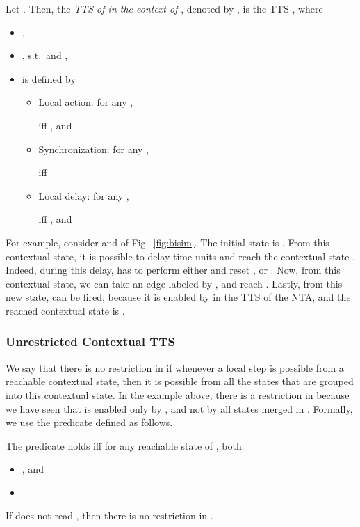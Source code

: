 \documentclass{LMCS}
\theoremstyle{plain}\newtheorem*{prop11}{Proposition~\ref{prop:states} bis}
\begin{document}
\begin{defi}
Let \mbox{}.
Then, the \emph{TTS of  in the context of }, denoted by
, is the TTS
, where
\begin{itemize}
  \item , \item , s.t.\  and
  ,
  \item  is defined by
  \begin{itemize}
    \item Local action: for any ,
    
    iff ,
    and 
\item Synchronization: for any ,
    
    iff 
\item Local delay: for any ,
    
    iff , and  
\end{itemize}
\end{itemize}
\end{defi}

\noindent For example, consider  and  of Fig.~\ref{fig:bisim}. The initial
state is . From this contextual
state, it is possible to delay  time units and reach the contextual
state . Indeed,
during this delay,  has to perform either  and reset , or
. Now, from this contextual state, we can take an edge labeled by ,
and reach . Lastly,
from this new state,  can be fired, because it is enabled by
 in the TTS of the NTA, and the reached
contextual state is .




\subsubsection*{Unrestricted Contextual TTS}
We say that there is no restriction in  if whenever a local
step is possible from a reachable contextual state, then it is possible from all
the states  that are grouped into this contextual state.
In the example above, there is a restriction in  because
we have seen that  is enabled only by ,
and not by all states merged in
.
Formally, we use the predicate  defined as follows.

\begin{defi}[\text{}]
The predicate  holds iff for any reachable state
 of , both
\begin{itemize}
  \item , and
  \item 
\end{itemize}
\end{defi}
\begin{rem}\label{rem:noread_norest}
  If  does not read , then there is no restriction in
  .
\end{rem}
\end{document}
